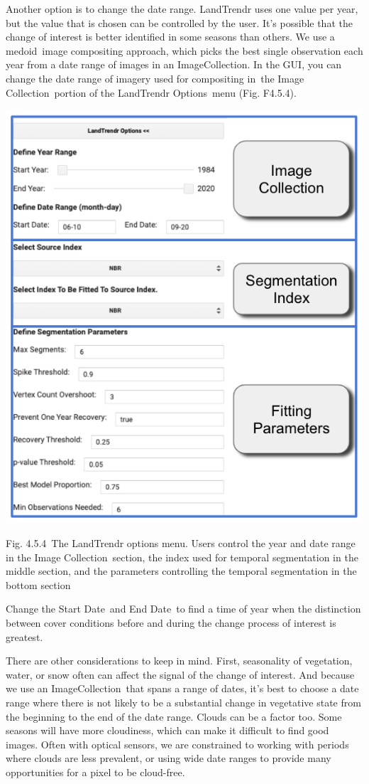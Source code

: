 \documentclass[
  letterpaper,
  DIV=11,
  numbers=noendperiod]{scrreprt}
\begin{document}
Another option is to change the date range. LandTrendr uses one value
per year, but the value that is chosen can be controlled by the user.
It's possible that the change of interest is better identified in some
seasons than others. We use a medoid~image compositing approach, which
picks the best single observation each year from a date range of images
in an ImageCollection. In the GUI, you can change the date range of
imagery used for compositing in~the Image Collection~portion of the
LandTrendr Options~menu (Fig. F4.5.4). ~

\includegraphics{./F4/image7.png}

Fig. 4.5.4~The LandTrendr options menu. Users control the year and date
range in the Image Collection~section, the index used for temporal
segmentation in the middle section, and the parameters controlling the
temporal segmentation in the bottom section

Change the Start Date~and End Date~to find a time of year when the
distinction between cover conditions before and during the change
process of interest is greatest.

There are other considerations to keep in mind. First, seasonality of
vegetation, water, or snow often can affect the signal of the change of
interest. And because we use an ImageCollection~that spans a range of
dates, it's best to choose a date range where there is not likely to be
a substantial change in vegetative state from the beginning to the end
of the date range. Clouds can be a factor too. Some seasons will have
more cloudiness, which can make it difficult to find good images. Often
with optical sensors, we are constrained to working with periods where
clouds are less prevalent, or using wide date ranges to provide many
opportunities for a pixel to be cloud-free.
\end{document}
